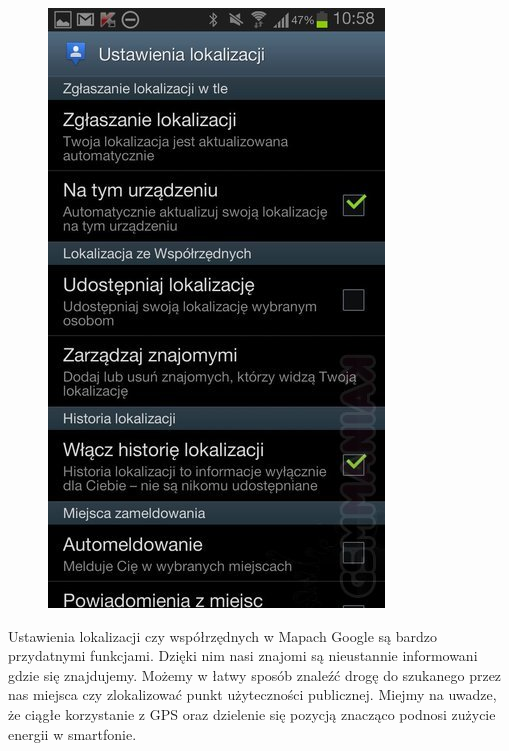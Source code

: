 \begin{figure}[H]
\centering
\includegraphics[scale=0.5]{czlonkowie/5/5ss.jpg}
\end{figure}
Ustawienia lokalizacji czy współrzędnych w Mapach Google są bardzo przydatnymi funkcjami. Dzięki nim nasi znajomi są nieustannie informowani gdzie się znajdujemy. Możemy w łatwy sposób znaleźć drogę do szukanego przez nas miejsca czy zlokalizować punkt użyteczności publicznej. Miejmy na uwadze, że ciągłe korzystanie z GPS oraz dzielenie się pozycją znacząco podnosi zużycie energii w smartfonie.
